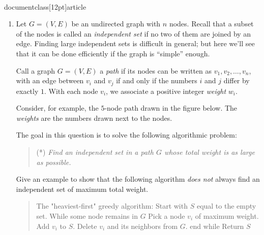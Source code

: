 \\documentclass[12pt]{article}
\begin{document}
\begin{enumerate}
{An analogous observation holds if the optimal plan ends in SF.
Thus, if $OPT_N(j)$ denotes the minimum cost of a plan 
on months $1, \ldots, j$ ending in NY, and 
$OPT_S(j)$ denotes the minimum cost of a plan 
on months $1, \ldots, j$ ending in SF, then
$$OPT_N(n) = N_n + \min(OPT_N(n-1), M + OPT_S(n-1))$$
$$OPT_S(n) = S_n + \min(OPT_S(n-1), M + OPT_N(n-1))$$
This can be translated directly into an algorithm:
\begin{quote}
\begin{code}
$OPT_N(0) = OPT_S(0) = 0$
For $i = 1, \ldots, n$
  $OPT_N(i) = N_i + \min(OPT_N(i-1), M + OPT_S(i-1))$
  $OPT_S(i) = S_i + \min(OPT_S(i-1), M + OPT_N(i-1))$
End
Return the smaller of $OPT_N(n)$ and $OPT_S(n)$
\end{code}
\end{quote}
The algorithm has $n$ iterations, and each takes constant
time.  Thus the running time is $O(n)$.

}


\item

Let $G = (V,E)$ be an undirected graph with $n$ nodes.
Recall that a subset of the nodes is called an {\em independent set}
if no two of them are joined by an edge.
Finding large independent sets is difficult in general;
but here we'll see that it can be done efficiently if the
graph is ``simple'' enough.

Call a graph $G = (V,E)$ a {\em path} if its nodes can be
written as $v_1, v_2, \ldots, v_n$, with an edge between
$v_i$ and $v_j$ if and only if the numbers $i$ and $j$ differ by exactly $1$.
With each node $v_i$, we associate a positive integer {\em weight} $w_i$.

Consider, for example, the $5$-node path drawn in the figure below.
The {\em weights} are the numbers drawn next to the nodes.

The goal in this question is to solve the following algorithmic
problem:
\begin{quote}
(*) {\em Find an independent set in a path $G$ whose total weight is as large
as possible.}
\end{quote}

Give an example to show that the following algorithm
{\em does not} always find an independent set of maximum
total weight.
\begin{quote}
\begin{code}
The "heaviest-first" greedy algorithm:
  Start with $S$ equal to the empty set.
  While some node remains in $G$
    Pick a node $v_i$ of maximum weight.
    Add $v_i$ to $S$.
    Delete $v_i$ and its neighbors from $G$.
  end while
  Return $S$
\end{code}
\end{quote}


\end{enumerate}
\end{document}
